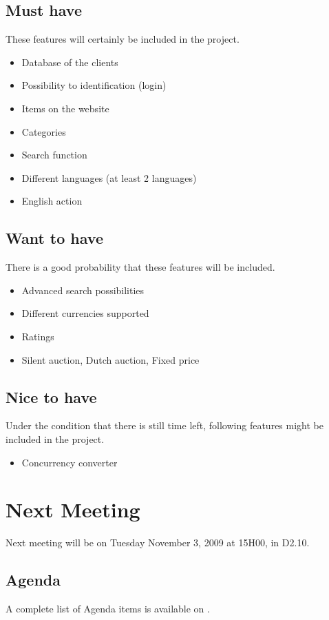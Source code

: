 \documentclass[a4paper, 12pt]{article}
\begin{document}
	\subsection{Must have}
	These features will certainly be included in the project.
		\begin{itemize}
			\item Database of the clients
			\item Possibility to identification (login)
			\item Items on the website
			\item Categories
			\item Search function
			\item Different languages (at least 2 languages)
			\item English action
		\end{itemize}
	
	\subsection{Want to have}
	There is a good probability that these features will be included.
		\begin{itemize}
			\item Advanced search possibilities
			\item Different currencies supported
			\item Ratings
			\item Silent auction, Dutch auction, Fixed price 
		\end{itemize}
		
	\subsection{Nice to have}
	Under the condition that there is still time left, following features might be included in the project.
		\begin{itemize}
			\item Concurrency converter
		\end{itemize}
		
	\section{Next Meeting}
	
	Next meeting will be on Tuesday November 3, 2009 at 15H00, in D2.10. 
	
	\subsection{Agenda}
	A complete list of Agenda items is available on \cite{site3}.
\end{document}

